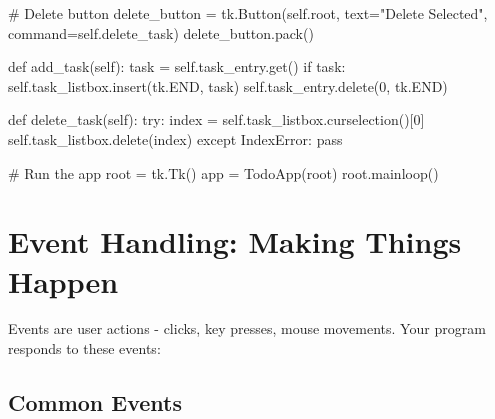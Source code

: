 \documentclass[
  letterpaper,
  DIV=11,
  numbers=noendperiod,
  oneside]{scrreprt}
\newenvironment{Shaded}{}{}
\newcommand{\CommentTok}[1]{\textcolor[rgb]{0.42,0.45,0.49}{#1}}
\newcommand{\ControlFlowTok}[1]{\textcolor[rgb]{0.84,0.23,0.29}{#1}}
\newcommand{\DecValTok}[1]{\textcolor[rgb]{0.00,0.36,0.77}{#1}}
\newcommand{\KeywordTok}[1]{\textcolor[rgb]{0.84,0.23,0.29}{#1}}
\newcommand{\NormalTok}[1]{\textcolor[rgb]{0.14,0.16,0.18}{#1}}
\newcommand{\OperatorTok}[1]{\textcolor[rgb]{0.14,0.16,0.18}{#1}}
\newcommand{\PreprocessorTok}[1]{\textcolor[rgb]{0.84,0.23,0.29}{#1}}
\newcommand{\StringTok}[1]{\textcolor[rgb]{0.01,0.18,0.38}{#1}}
\newcommand{\VariableTok}[1]{\textcolor[rgb]{0.89,0.38,0.04}{#1}}
\begin{document}
\begin{Shaded}
\begin{Highlighting}[]
        \CommentTok{\# Delete button}
\NormalTok{        delete\_button }\OperatorTok{=}\NormalTok{ tk.Button(}\VariableTok{self}\NormalTok{.root, text}\OperatorTok{=}\StringTok{"Delete Selected"}\NormalTok{, command}\OperatorTok{=}\VariableTok{self}\NormalTok{.delete\_task)}
\NormalTok{        delete\_button.pack()}
        
    \KeywordTok{def}\NormalTok{ add\_task(}\VariableTok{self}\NormalTok{):}
\NormalTok{        task }\OperatorTok{=} \VariableTok{self}\NormalTok{.task\_entry.get()}
        \ControlFlowTok{if}\NormalTok{ task:}
            \VariableTok{self}\NormalTok{.task\_listbox.insert(tk.END, task)}
            \VariableTok{self}\NormalTok{.task\_entry.delete(}\DecValTok{0}\NormalTok{, tk.END)}
            
    \KeywordTok{def}\NormalTok{ delete\_task(}\VariableTok{self}\NormalTok{):}
        \ControlFlowTok{try}\NormalTok{:}
\NormalTok{            index }\OperatorTok{=} \VariableTok{self}\NormalTok{.task\_listbox.curselection()[}\DecValTok{0}\NormalTok{]}
            \VariableTok{self}\NormalTok{.task\_listbox.delete(index)}
        \ControlFlowTok{except} \PreprocessorTok{IndexError}\NormalTok{:}
            \ControlFlowTok{pass}

\CommentTok{\# Run the app}
\NormalTok{root }\OperatorTok{=}\NormalTok{ tk.Tk()}
\NormalTok{app }\OperatorTok{=}\NormalTok{ TodoApp(root)}
\NormalTok{root.mainloop()}
\end{Highlighting}
\end{Shaded}

\section{Event Handling: Making Things
Happen}\label{event-handling-making-things-happen}

Events are user actions - clicks, key presses, mouse movements. Your
program responds to these events:

\subsection{Common Events}\label{common-events}
\end{document}

